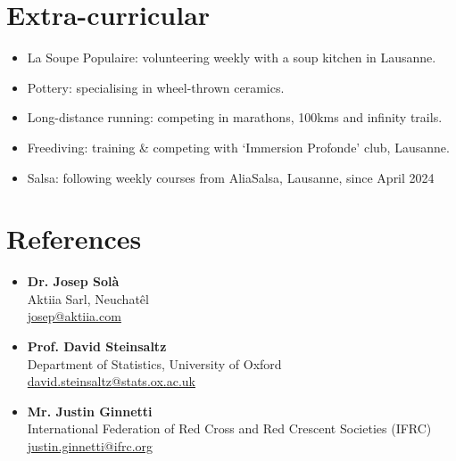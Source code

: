 \documentclass[a4paper,10pt]{article}
\begin{document}
\section*{Extra-curricular}
\begin{itemize}[leftmargin=*,noitemsep]
  \item La Soupe Populaire: volunteering weekly with a soup kitchen in Lausanne.
  \item Pottery: specialising in wheel-thrown ceramics.
  \item Long-distance running: competing in marathons, 100kms and infinity trails.
  \item Freediving: training \& competing with `Immersion Profonde' club, Lausanne.
  \item Salsa: following weekly courses from AliaSalsa, Lausanne, since April 2024
\end{itemize}

\section*{References}

\begin{itemize}[leftmargin=*,noitemsep]
  \item \textbf{Dr. Josep Solà} \\
  Aktiia Sarl, Neuchatêl \\
  \href{mailto:josep@aktiia.com}{josep@aktiia.com}
  \vspace{0.2cm}
  \item \textbf{Prof. David Steinsaltz} \\
  Department of Statistics, University of Oxford \\
  \href{mailto:david.steinsaltz@stats.ox.ac.uk}{david.steinsaltz@stats.ox.ac.uk}
  \vspace{0.2cm}
  \item \textbf{Mr. Justin Ginnetti} \\
  International Federation of Red Cross and Red Crescent Societies (IFRC) \\
  \href{mailto:justin.ginnetti@ifrc.org}{justin.ginnetti@ifrc.org}
\end{itemize}
\end{document}
